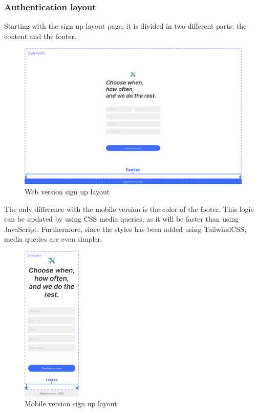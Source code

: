 \documentclass[./memory.tex]{subfiles}
\begin{document}
\subsubsection{Authentication layout}
Starting with the sign up layout page, it is divided in two different parts: the
content and the footer.
\begin{figure}[H]
	\centering
	\includegraphics[width=\textwidth]{./assets/designs/sign-up-layout-web.png}
	\caption{Web version sign up layout}
\end{figure}
The only difference with the mobile version is the color of the footer. This
logic can be updated by using CSS media queries, as it will be faster than using
JavaScript. Furthermore, since the styles has been added using TailwindCSS,
media queries are even simpler.
\begin{figure}[H]
	\centering
	\includegraphics[width=0.25\textwidth]{./assets/designs/sign-up-layout-sm.png}
	\caption{Mobile version sign up layout}
\end{figure}
\end{document}
